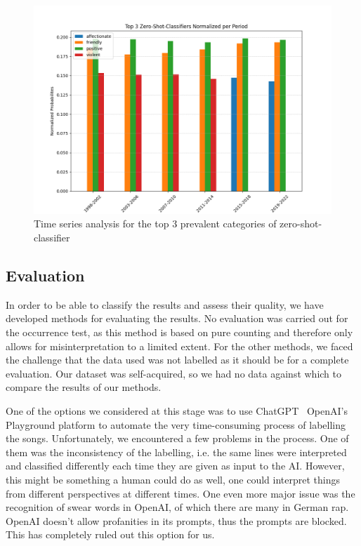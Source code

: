 \begin{figure}[!htb]
    \centering
    \includegraphics[width=\textwidth]{figures/top_3_time_series_zero_shot.png}
    \caption{Time series analysis for the top 3 prevalent categories of zero-shot-classifier}
    \label{fig:zero-shot2}
\end{figure}

\subsection*{Evaluation}

In order to be able to classify the results and assess their quality, we have developed methods for evaluating the results. No evaluation was carried out for the occurrence test, as this method is based on pure counting and therefore only allows for misinterpretation to a limited extent. For the other methods, we faced the challenge that the data used was not labelled as it should be for a complete evaluation. Our dataset was self-acquired, so we had no data against which to compare the results of our methods.

One of the options we considered at this stage was to use ChatGPT \ OpenAI's Playground platform to automate the very time-consuming process of labelling the songs. Unfortunately, we encountered a few problems in the process. One of them was the inconsistency of the labelling, i.e. the same lines were interpreted and classified differently each time they are given as input to the AI. However, this might be something a human could do as well, one could interpret things from different perspectives at different times. One even more major issue was the recognition of swear words in OpenAI, of which there are many in German rap. OpenAI doesn't allow profanities in its prompts, thus the prompts are blocked. This has completely ruled out this option for us.


